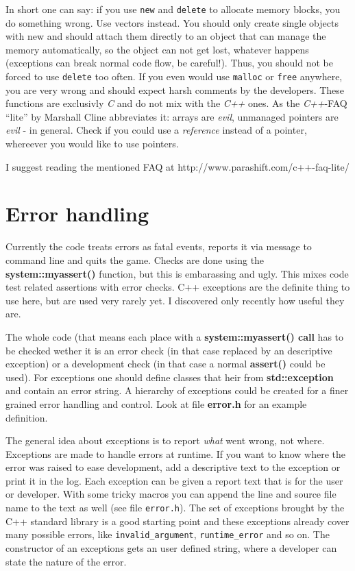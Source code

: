 \documentclass[english,a4paper,12pt]{report}
\begin{document}
In short one can say: if you use \texttt{new} and \texttt{delete} to
allocate memory blocks, you do something wrong. Use vectors instead. You
should only create single objects with new and should attach them
directly to an object that can manage the memory automatically, so the
object can not get lost, whatever happens (exceptions can break normal
code flow, be careful!). Thus, you should not be forced to use
\texttt{delete} too often. If you even would use \texttt{malloc} or
\texttt{free} anywhere, you are very wrong and should expect harsh
comments by the developers. These functions are exclusivly \emph{C} and
do not mix with the \emph{C++} ones. As the \emph{C++}-FAQ ``lite'' by
Marshall Cline abbreviates it: arrays are \emph{evil}, unmanaged
pointers are \emph{evil} - in general. Check if you could use a
\emph{reference} instead of a pointer, whereever you would like to use
pointers.

I suggest reading the mentioned FAQ at
http://www.parashift.com/c++-faq-lite/

\section{Error handling}

Currently the code treats errors as fatal events, reports it via message
to command line and quits the game. Checks are done using the
\textbf{system::myassert()} function, but this is embarassing and ugly.
This mixes code test related assertions with error checks.  C++
exceptions are the definite thing to use here, but are used very rarely
yet. I discovered only recently how useful they are.
    
The whole code (that means each place with a \textbf{system::myassert()
  call} has to be checked wether it is an error check (in that case
replaced by an descriptive exception) or a development check (in that
case a normal \textbf{assert()} could be used). For exceptions one
should define classes that heir from \textbf{std::exception} and contain
an error string. A hierarchy of exceptions could be created for a finer
grained error handling and control. Look at file \textbf{error.h} for an
example definition.

The general idea about exceptions is to report \emph{what} went wrong,
not where. Exceptions are made to handle errors at runtime. If you want
to know where the error was raised to ease development, add a
descriptive text to the exception or print it in the log. Each exception
can be given a report text that is for the user or developer. With some
tricky macros you can append the line and source file name to the text
as well (see file \texttt{error.h}). The set of exceptions brought by
the C++ standard library is a good starting point and these exceptions
already cover many possible errors, like \texttt{invalid\_argument},
\texttt{runtime\_error} and so on. The constructor of an exceptions gets
an user defined string, where a developer can state the nature of the
error.
\end{document}
